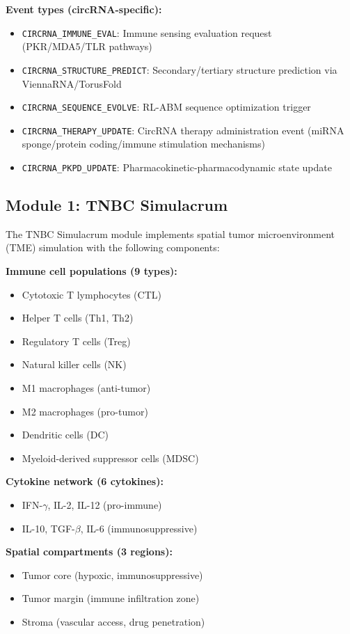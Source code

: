 \documentclass[12pt]{article}
\begin{document}
\textbf{Event types (circRNA-specific):}
\begin{itemize}
\item \texttt{CIRCRNA\_IMMUNE\_EVAL}: Immune sensing evaluation request (PKR/MDA5/TLR pathways)
\item \texttt{CIRCRNA\_STRUCTURE\_PREDICT}: Secondary/tertiary structure prediction via ViennaRNA/TorusFold
\item \texttt{CIRCRNA\_SEQUENCE\_EVOLVE}: RL-ABM sequence optimization trigger
\item \texttt{CIRCRNA\_THERAPY\_UPDATE}: CircRNA therapy administration event (miRNA sponge/protein coding/immune stimulation mechanisms)
\item \texttt{CIRCRNA\_PKPD\_UPDATE}: Pharmacokinetic-pharmacodynamic state update
\end{itemize}

\subsection{Module 1: TNBC Simulacrum}

The TNBC Simulacrum module implements spatial tumor microenvironment (TME) simulation with the following components:

\textbf{Immune cell populations (9 types):}
\begin{itemize}
\item Cytotoxic T lymphocytes (CTL)
\item Helper T cells (Th1, Th2)
\item Regulatory T cells (Treg)
\item Natural killer cells (NK)
\item M1 macrophages (anti-tumor)
\item M2 macrophages (pro-tumor)
\item Dendritic cells (DC)
\item Myeloid-derived suppressor cells (MDSC)
\end{itemize}

\textbf{Cytokine network (6 cytokines):}
\begin{itemize}
\item IFN-$\gamma$, IL-2, IL-12 (pro-immune)
\item IL-10, TGF-$\beta$, IL-6 (immunosuppressive)
\end{itemize}

\textbf{Spatial compartments (3 regions):}
\begin{itemize}
\item Tumor core (hypoxic, immunosuppressive)
\item Tumor margin (immune infiltration zone)
\item Stroma (vascular access, drug penetration)
\end{itemize}
\end{document}
